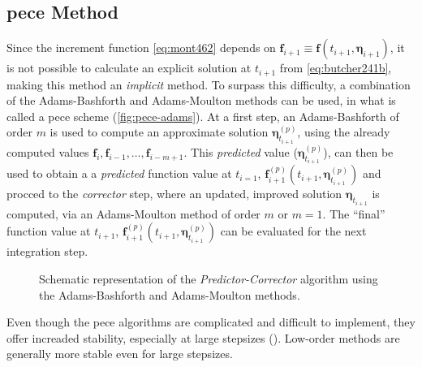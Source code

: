 \subsection{\gls{pece} Method}\label{ssec:predictor-corrector-method}

Since the increment function \autoref{eq:mont462} depends on 
$\bm{f}_{i+1} \equiv \bm{f}(t_{i+1}, \bm{\eta}_{i+1})$, it is not possible to 
calculate an explicit solution at $t_{i+1}$ from \autoref{eq:butcher241b}, 
making this method an \emph{implicit} method. To surpass this difficulty, a combination 
of the Adams-Bashforth and Adams-Moulton methods can be used, in what is called a 
\gls{pece} scheme (\autoref{fig:pece-adams}). 
At a first step, an Adams-Bashforth of order $m$ is used to compute an approximate 
solution $\bm{\eta}^{(p)}_{t_{i+1}}$, using the already computed values 
$\bm{f}_i, \bm{f}_{i-1}, \dots , \bm{f}_{i-m+1}$. This \emph{predicted} value 
($\bm{\eta}^{(p)}_{t_{i+1}}$), can then be used to obtain a a \emph{predicted} 
function value at $t_{i=1}$, $\bm{f}^{(p)}_{i+1}(t_{i+1},\bm{\eta}^{(p)}_{t_{i+1}})$ 
and procced to the \emph{corrector} step, where an updated, improved solution 
$\bm{\eta}_{t_{i+1}}$ is computed, via an Adams-Moulton method of order $m$ or 
$m=1$. The ``final'' function value at $t_{i+1}$, 
$\bm{f}^{(p)}_{i+1}(t_{i+1},\bm{\eta}^{(p)}_{t_{i+1}})$ can be evaluated for the 
next integration step.

\begin{figure}
    \centering
    
    \caption{Schematic representation of the \emph{Predictor-Corrector} algorithm using the Adams-Bashforth and Adams-Moulton methods.}
    \label{fig:pece-adams}
  \end{figure}

Even though the \gls{pece} algorithms are complicated and difficult to implement, 
they offer increaded stability, especially at large stepsizes (\cite{Montenbruck2000}).
Low-order methods are generally more stable even for large stepsizes.